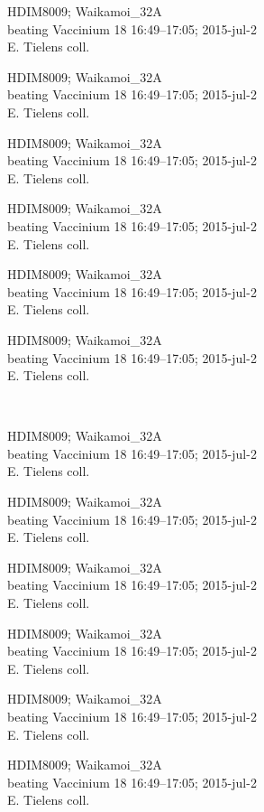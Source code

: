 \documentclass[2pt]{extarticle}
\begin{document}
\noindent
\parbox{0.16\textwidth}{\tiny \raggedright \rule[-0.3\baselineskip]{0pt}{10pt}HDIM8009; Waikamoi\_32A\\ beating Vaccinium 18 16:49--17:05; 2015-jul-2\\ E. Tielens coll.}
\parbox{0.16\textwidth}{\tiny \raggedright \rule[-0.3\baselineskip]{0pt}{10pt}HDIM8009; Waikamoi\_32A\\ beating Vaccinium 18 16:49--17:05; 2015-jul-2\\ E. Tielens coll.}
\parbox{0.16\textwidth}{\tiny \raggedright \rule[-0.3\baselineskip]{0pt}{10pt}HDIM8009; Waikamoi\_32A\\ beating Vaccinium 18 16:49--17:05; 2015-jul-2\\ E. Tielens coll.}
\parbox{0.16\textwidth}{\tiny \raggedright \rule[-0.3\baselineskip]{0pt}{10pt}HDIM8009; Waikamoi\_32A\\ beating Vaccinium 18 16:49--17:05; 2015-jul-2\\ E. Tielens coll.}
\parbox{0.16\textwidth}{\tiny \raggedright \rule[-0.3\baselineskip]{0pt}{10pt}HDIM8009; Waikamoi\_32A\\ beating Vaccinium 18 16:49--17:05; 2015-jul-2\\ E. Tielens coll.}
\parbox{0.16\textwidth}{\tiny \raggedright \rule[-0.3\baselineskip]{0pt}{10pt}HDIM8009; Waikamoi\_32A\\ beating Vaccinium 18 16:49--17:05; 2015-jul-2\\ E. Tielens coll.} \\ 
\vspace{0.001in} 

\noindent
\parbox{0.16\textwidth}{\tiny \raggedright \rule[-0.3\baselineskip]{0pt}{10pt}HDIM8009; Waikamoi\_32A\\ beating Vaccinium 18 16:49--17:05; 2015-jul-2\\ E. Tielens coll.}
\parbox{0.16\textwidth}{\tiny \raggedright \rule[-0.3\baselineskip]{0pt}{10pt}HDIM8009; Waikamoi\_32A\\ beating Vaccinium 18 16:49--17:05; 2015-jul-2\\ E. Tielens coll.}
\parbox{0.16\textwidth}{\tiny \raggedright \rule[-0.3\baselineskip]{0pt}{10pt}HDIM8009; Waikamoi\_32A\\ beating Vaccinium 18 16:49--17:05; 2015-jul-2\\ E. Tielens coll.}
\parbox{0.16\textwidth}{\tiny \raggedright \rule[-0.3\baselineskip]{0pt}{10pt}HDIM8009; Waikamoi\_32A\\ beating Vaccinium 18 16:49--17:05; 2015-jul-2\\ E. Tielens coll.}
\parbox{0.16\textwidth}{\tiny \raggedright \rule[-0.3\baselineskip]{0pt}{10pt}HDIM8009; Waikamoi\_32A\\ beating Vaccinium 18 16:49--17:05; 2015-jul-2\\ E. Tielens coll.}
\parbox{0.16\textwidth}{\tiny \raggedright \rule[-0.3\baselineskip]{0pt}{10pt}HDIM8009; Waikamoi\_32A\\ beating Vaccinium 18 16:49--17:05; 2015-jul-2\\ E. Tielens coll.}
\end{document}
